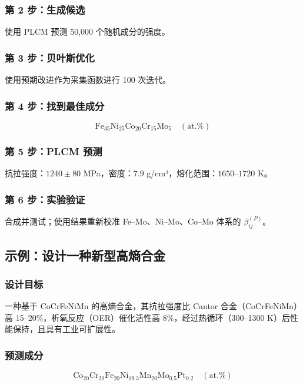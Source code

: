 \documentclass[12pt,a4paper]{article}
\begin{document}
	\subsubsection{第 2 步：生成候选}
	使用 PLCM 预测 50,000 个随机成分的强度。
	
	\subsubsection{第 3 步：贝叶斯优化}
	使用预期改进作为采集函数进行 100 次迭代。
	
	\subsubsection{第 4 步：找到最佳成分}
	\[
	\text{Fe}_{35}\text{Ni}_{25}\text{Co}_{20}\text{Cr}_{15}\text{Mo}_{5} \quad (\text{at.}\%)
	\]
	
	\subsubsection{第 5 步：PLCM 预测}
	抗拉强度：\(1240 \pm 80\) MPa，密度：\(7.9\) g/cm³，熔化范围：\(1650\)–\(1720\) K。
	
	\subsubsection{第 6 步：实验验证}
	合成并测试；使用结果重新校准 Fe–Mo、Ni–Mo、Co–Mo 体系的 \(\beta_{ij}^{(P)}\)。
	
	\subsection{示例：设计一种新型高熵合金}
	
	\subsubsection{设计目标}
	一种基于 CoCrFeNiMn 的高熵合金，其抗拉强度比 Cantor 合金（CoCrFeNiMn）高 15–20\%，析氧反应（OER）催化活性高 8\%，经过热循环（300–1300 K）后性能保持，且具有工业可扩展性。
	
	\subsubsection{预测成分}
	\[
	\text{Co}_{20}\text{Cr}_{20}\text{Fe}_{20}\text{Ni}_{19.3}\text{Mn}_{20}\text{Mo}_{0.5}\text{Pt}_{0.2}\quad (\text{at.}\%)
	\]
	
\end{document}
